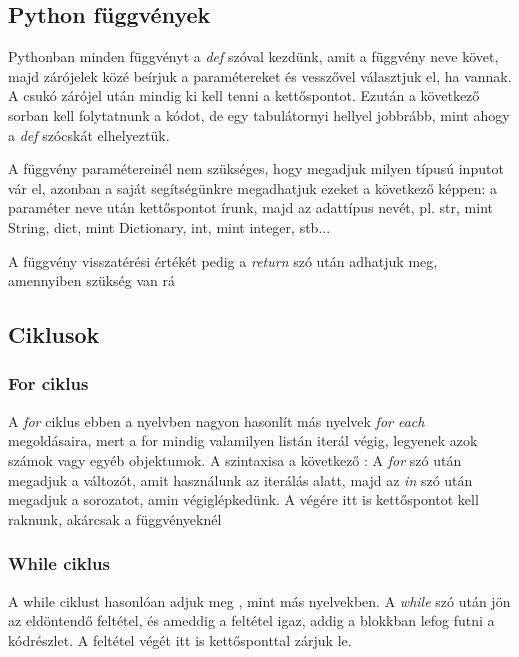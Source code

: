 \documentclass{article}
\theoremstyle{definition}
\theoremstyle{theorem}
\begin{document}
\subsection{Python függvények}
Pythonban minden függvényt a \textit{def} szóval kezdünk, amit a függvény neve követ, majd zárójelek közé beírjuk a paramétereket és vesszővel választjuk el, ha vannak. A csukó zárójel után mindig ki kell tenni a kettőspontot. Ezután a következő sorban kell folytatnunk a kódot, de egy tabulátornyi hellyel jobbrább, mint ahogy a \textit{def} szócskát elhelyeztük.

A függvény paramétereinél nem szükséges, hogy megadjuk milyen típusú inputot vár el, azonban a saját segítségünkre megadhatjuk ezeket a következő képpen: a paraméter neve után kettőspontot írunk, majd az adattípus nevét, pl. str, mint String, dict, mint Dictionary, int, mint integer, stb...


A függvény visszatérési értékét pedig a \textit{return} szó után adhatjuk meg, amennyiben szükség van rá
\subsection{Ciklusok}
\subsubsection{For ciklus}
A \textit{for} ciklus ebben a nyelvben nagyon hasonlít más nyelvek \textit{for each} megoldásaira, mert a for mindig valamilyen listán iterál végig, legyenek azok számok vagy egyéb objektumok. A szintaxisa a következő :
A \textit{for} szó után megadjuk a változót, amit használunk az iterálás alatt, majd az \textit{in} szó után megadjuk a sorozatot, amin végiglépkedünk. A végére itt is kettőspontot kell raknunk, akárcsak a függvényeknél



\subsubsection{While ciklus}
A while ciklust hasonlóan adjuk meg , mint más nyelvekben. A \textit{while} szó után jön az eldöntendő feltétel, és ameddig a feltétel igaz, addig a blokkban lefog futni a kódrészlet. A feltétel végét itt is kettősponttal zárjuk le.

\end{document}
